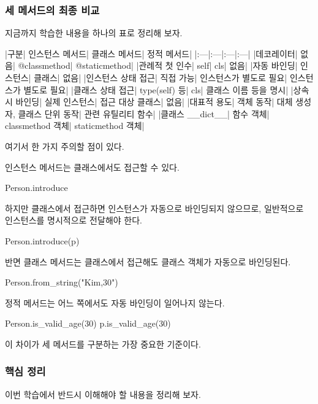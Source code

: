 \subsubsection{세 메서드의 최종 비교}

지금까지 학습한 내용을 하나의 표로 정리해 보자.

\begin{dhktable}
|구분|	인스턴스 메서드|	클래스 메서드|	정적 메서드|
|:---|:---|:---|:---|
|데코레이터|	없음|	@classmethod|	@staticmethod|
|관례적 첫 인수|	self|	cls|	없음|
|자동 바인딩|	인스턴스|	클래스|	없음|
|인스턴스 상태 접근|	직접 가능|	인스턴스가 별도로 필요|	인스턴스가 별도로 필요|
|클래스 상태 접근|	type(self) 등|	cls|	클래스 이름 등을 명시|
|상속 시 바인딩|	실제 인스턴스|	접근 대상 클래스|	없음|
|대표적 용도|	객체 동작|	대체 생성자, 클래스 단위 동작|	관련 유틸리티 함수|
|클래스 __dict__|	함수 객체|	classmethod 객체|	staticmethod 객체|
\end{dhktable}

여기서 한 가지 주의할 점이 있다.

인스턴스 메서드는 클래스에서도 접근할 수 있다.

\begin{dhkcode}
Person.introduce
\end{dhkcode}

하지만 클래스에서 접근하면 인스턴스가 자동으로 바인딩되지 않으므로, 일반적으로 인스턴스를 명시적으로 전달해야 한다.

\begin{dhkcode}
Person.introduce(p)
\end{dhkcode}

반면 클래스 메서드는 클래스에서 접근해도 클래스 객체가 자동으로 바인딩된다.

\begin{dhkcode}
Person.from_string("Kim,30")
\end{dhkcode}

정적 메서드는 어느 쪽에서도 자동 바인딩이 일어나지 않는다.

\begin{dhkcode}
Person.is_valid_age(30)
p.is_valid_age(30)
\end{dhkcode}

이 차이가 세 메서드를 구분하는 가장 중요한 기준이다.

\subsubsection{핵심 정리}

이번 학습에서 반드시 이해해야 할 내용을 정리해 보자.

